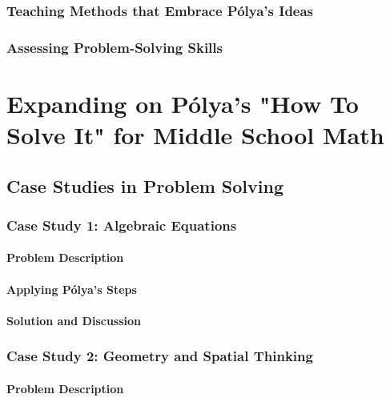 \documentclass{book}
\begin{document}
\subsection{Teaching Methods that Embrace Pólya's Ideas}
\subsection{Assessing Problem-Solving Skills}


\chapter{Expanding on Pólya's "How To Solve It" for Middle School Math}


\section{Case Studies in Problem Solving}


\subsection{Case Study 1: Algebraic Equations}
\subsubsection{Problem Description}
\subsubsection{Applying Pólya's Steps}
\subsubsection{Solution and Discussion}


\subsection{Case Study 2: Geometry and Spatial Thinking}
\subsubsection{Problem Description}
\end{document}
